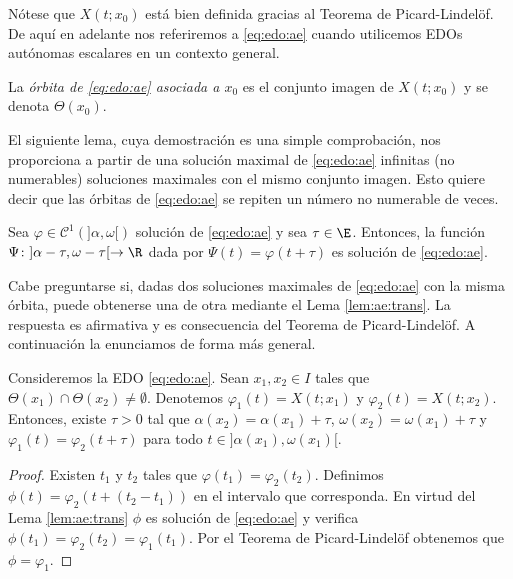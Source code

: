 \documentclass{article}
\begin{document}
Nótese que $X(t; x_0)$ está bien definida gracias al Teorema de Picard-Lindelöf. De aquí en adelante
nos referiremos a \eqref{eq:edo:ae} cuando utilicemos EDOs autónomas escalares en un contexto
general.

\begin{definition}
  La \emph{órbita de \eqref{eq:edo:ae} asociada a $x_0$} es el conjunto imagen de $X(t; x_0)$ y se
  denota $\Theta(x_0)$.
\end{definition}

El siguiente lema, cuya demostración es una simple comprobación, nos proporciona a partir de una
solución maximal de \eqref{eq:edo:ae} infinitas (no numerables) soluciones maximales con el mismo
conjunto imagen. Esto quiere decir que las órbitas de \eqref{eq:edo:ae} se repiten un número no
numerable de veces.

\begin{lemma} \label{lem:ae:trans} Sea $\varphi \in \mathcal{C}^1(]\alpha, \omega[)$ solución de
  \eqref{eq:edo:ae} y sea $\tau \in \E$. Entonces, la función
  $\Psi \colon ]\alpha-\tau, \omega-\tau[ \to \R$ dada por $\Psi(t) = \varphi(t+\tau)$ es solución
  de \eqref{eq:edo:ae}.
\end{lemma}

Cabe preguntarse si, dadas dos soluciones maximales de \eqref{eq:edo:ae} con la misma órbita, puede
obtenerse una de otra mediante el Lema \ref{lem:ae:trans}. La respuesta es afirmativa y es
consecuencia del Teorema de Picard-Lindelöf. A continuación la enunciamos de forma más general.

\begin{lemma} \label{lem:ae:trans:2} Consideremos la EDO \eqref{eq:edo:ae}. Sean $x_1, x_2 \in I$
  tales que $\Theta(x_1) \cap \Theta(x_2) \ne \emptyset$. Denotemos $\varphi_1(t) = X(t;x_1)$ y
  $\varphi_2(t) = X(t;x_2)$. Entonces, existe $\tau > 0$ tal que $\alpha(x_2) = \alpha(x_1)+\tau$,
  $\omega(x_2) = \omega(x_1)+\tau$ y $\varphi_1(t) = \varphi_2(t+\tau)$ para todo
  $t \in ]\alpha(x_1), \omega(x_1)[$.
\end{lemma}
\begin{proof}
  Existen $t_1$ y $t_2$ tales que $\varphi(t_1) = \varphi_2(t_2)$. Definimos
  $\phi(t) = \varphi_2(t + (t_2 - t_1))$ en el intervalo que corresponda. En virtud del Lema
  \ref{lem:ae:trans} $\phi$ es solución de \eqref{eq:edo:ae} y verifica
  $\phi(t_1) = \varphi_2(t_2) = \varphi_1(t_1)$. Por el Teorema de Picard-Lindelöf obtenemos que
  $\phi = \varphi_1$.
\end{proof}
\end{document}
